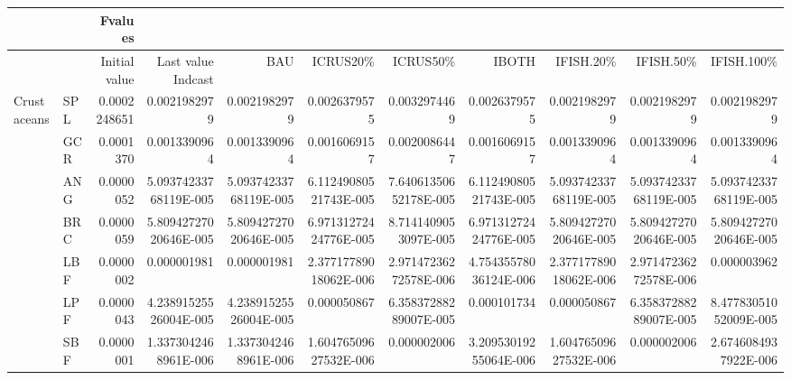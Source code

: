 \documentclass[11pt]{article}
\begin{document}
\begin{center}
\begin{tabular}{llrrrrrrrrr}
              &       &        Fvalues  &                         &                         &                         &                         &                         &                         &                         &                         \\
\hline
              &       &  Initial value  &     Last value Indcast  &                    BAU  &              ICRUS20\%  &              ICRUS50\%  &                  IBOTH  &             IFISH.20\%  &             IFISH.50\%  &            IFISH.100\%  \\
\hline
 Crustaceans  &  SPL  &   0.0002248651  &           0.0021982979  &           0.0021982979  &           0.0026379575  &           0.0032974469  &           0.0026379575  &           0.0021982979  &           0.0021982979  &           0.0021982979  \\
              &  GCR  &      0.0001370  &           0.0013390964  &           0.0013390964  &           0.0016069157  &           0.0020086447  &           0.0016069157  &           0.0013390964  &           0.0013390964  &           0.0013390964  \\
              &  ANG  &      0.0000052  &  5.09374233768119E-005  &  5.09374233768119E-005  &  6.11249080521743E-005  &  7.64061350652178E-005  &  6.11249080521743E-005  &  5.09374233768119E-005  &  5.09374233768119E-005  &  5.09374233768119E-005  \\
              &  BRC  &      0.0000059  &  5.80942727020646E-005  &  5.80942727020646E-005  &  6.97131272424776E-005  &   8.7141409053097E-005  &  6.97131272424776E-005  &  5.80942727020646E-005  &  5.80942727020646E-005  &  5.80942727020646E-005  \\
              &  LBF  &      0.0000002  &            0.000001981  &            0.000001981  &  2.37717789018062E-006  &  2.97147236272578E-006  &  4.75435578036124E-006  &  2.37717789018062E-006  &  2.97147236272578E-006  &            0.000003962  \\
              &  LPF  &      0.0000043  &  4.23891525526004E-005  &  4.23891525526004E-005  &            0.000050867  &  6.35837288289007E-005  &            0.000101734  &            0.000050867  &  6.35837288289007E-005  &  8.47783051052009E-005  \\
              &  SBF  &      0.0000001  &   1.3373042468961E-006  &   1.3373042468961E-006  &  1.60476509627532E-006  &            0.000002006  &  3.20953019255064E-006  &  1.60476509627532E-006  &            0.000002006  &   2.6746084937922E-006  \\

\end{tabular}
\end{center}
\end{document}
